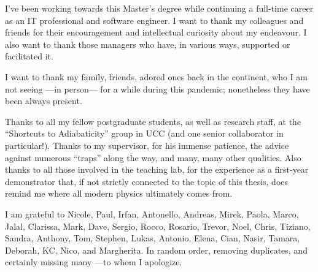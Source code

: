 {

  I've been working towards this Master's degree
  while continuing a full-time career
  as an IT professional and software engineer.
  I want to thank my
  colleagues and friends for their encouragement
  and intellectual curiosity
  about my endeavour.
  I also want to thank those managers
  who have, in various ways, supported or facilitated it.

  I want to thank my family, friends, adored ones back in the continent,
  who I am not seeing ---in person--- for a while during this pandemic;
  nonetheless they have been always present.
  
  Thanks to all my fellow postgraduate students,
  as well as research staff,
  at the ``Shortcuts to Adiabaticity'' group in UCC
  (and one senior collaborator in particular!).
  Thanks to my {supervisor}, for his immense patience,
  the advice against numerous ``traps'' along the way, and many, many other qualities.
  Also thanks to all those involved in the teaching lab, for the experience as a
  first-year demonstrator that,
  if not strictly connected to the topic of this thesis,
  does remind me where all modern physics ultimately comes from.

  I am grateful to
  Nicole,
  Paul,
  Irfan,
  Antonello,
  Andreas,
  Mirek,
  Paola,
  Marco,
  Jalal,
  Clarissa,
  Mark,
  Dave,
  Sergio,
  Rocco,
  Rosario,
  Trevor,
  Noel,
  Chris,
  Tiziano,
  Sandra,
  Anthony,
  Tom,
  Stephen,
  Lukas,
  Antonio,
  Elena,
  Cian,
  Nasir,
  Tamara,
  Deborah,
  KC,
  Nico,
  and Margherita.
  In random order, removing duplicates, and certainly missing many ---to whom I apologize.
}
